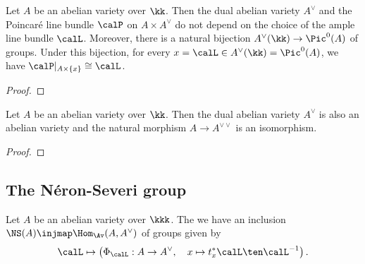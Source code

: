     \begin{theorem}\label{thm:dual_abelian_variety_as_Pic0}
        Let $A$ be an abelian variety over $\kk$. 
        Then the dual abelian variety \(A^\vee\) and the Poincar\'e line bundle \(\calP\) on \(A \times A^\vee\) do not depend on the choice of the ample line bundle \(\calL\).
        Moreover, there is a natural bijection \(A^\vee(\kk) \to \Pic^0(A)\) of groups.
        Under this bijection, for every \(x = \calL \in A^\vee(\kk) = \Pic^0(A)\), we have \(\calP|_{A \times \{x\}} \cong \calL\).
    \end{theorem}
    \begin{proof}
    \end{proof}

    \begin{proposition}\label{prop:dual_of_dual_is_A}
        Let \(A\) be an abelian variety over \(\kk\).
        Then the dual abelian variety \(A^\vee\) is also an abelian variety and the natural morphism \(A \to A^{\vee\vee}\) is an isomorphism.
    \end{proposition}
    \begin{proof}
    \end{proof}


\subsection{The N\'eron-Severi group}


    \begin{theorem}\label{thm:NS_A_as_homomorphisms_from_A_to_A_dual}
        Let \(A\) be an abelian variety over \(\kkk\).
        The we have an inclusion \(\NS(A) \injmap \Hom_{\Av}(A, A^\vee)\) of groups given by 
        \[ \calL \mapsto \left( \Phi_\calL: A \to A^\vee, \quad x \mapsto t_x^*\calL \ten \calL^{-1} \right). \]
    \end{theorem}

